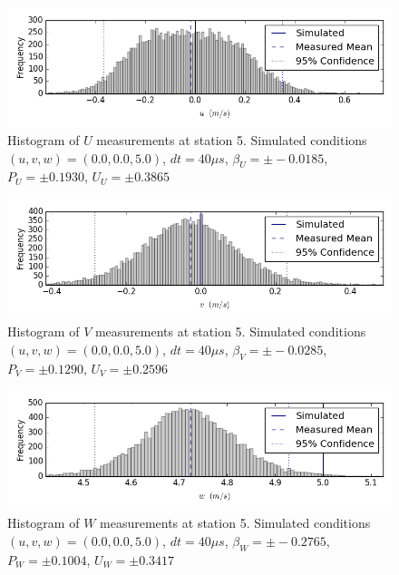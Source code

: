 \begin{figure}[H]
\centering
\includegraphics[width=6in]{figs/Ely_May28th05001/uncertainty_Ely_May28th05001_U}
\caption{Histogram of $U$ measurements at station 5. Simulated conditions $(u,v,w)=(0.0, 0.0, 5.0)$, $dt=40 \mu s$, $\beta_U=\pm -0.0185$, $P_U=\pm 0.1930$, $U_U=\pm 0.3865$}
\label{fig:uncertainty_Ely_May28th05001_U}
\end{figure}


\begin{figure}[H]
\centering
\includegraphics[width=6in]{figs/Ely_May28th05001/uncertainty_Ely_May28th05001_V}
\caption{Histogram of $V$ measurements at station 5. Simulated conditions $(u,v,w)=(0.0, 0.0, 5.0)$, $dt=40 \mu s$, $\beta_V=\pm -0.0285$, $P_V=\pm 0.1290$, $U_V=\pm 0.2596$}
\label{fig:uncertainty_Ely_May28th05001_V}
\end{figure}


\begin{figure}[H]
\centering
\includegraphics[width=6in]{figs/Ely_May28th05001/uncertainty_Ely_May28th05001_W}
\caption{Histogram of $W$ measurements at station 5. Simulated conditions $(u,v,w)=(0.0, 0.0, 5.0)$, $dt=40 \mu s$, $\beta_W=\pm -0.2765$, $P_W=\pm 0.1004$, $U_W=\pm 0.3417$}
\label{fig:uncertainty_Ely_May28th05001_W}
\end{figure}



